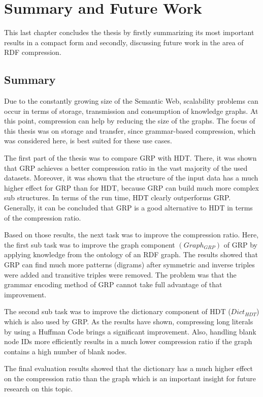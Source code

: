 \chapter{Summary and Future Work}\label{ch:summary_and_discussion}

This last chapter concludes the thesis by firstly summarizing its most important results in a compact form and secondly,  discussing  future work in the area of RDF compression.

\section{Summary}

Due to the constantly growing size of the Semantic Web, scalability problems can occur in terms of storage, transmission and consumption of knowledge graphs. At this point, compression can help by reducing the size of the graphs. The focus of this thesis was on storage and transfer, since grammar-based compression, which was considered here, is best suited for these use cases. 

The first part of the thesis was to compare GRP with HDT. There, it was shown that GRP achieves a better compression ratio in the vast majority of the used datasets. Moreover, it was shown that the structure of the input data has a much higher effect for GRP than for HDT, because GRP can build much more complex sub structures. In terms of the run time, HDT clearly outperforms GRP. Generally, it can be concluded that GRP is a good alternative to HDT in terms of the compression ratio.

Based on those results, the next task was to improve the compression ratio. Here, the first sub task was to improve the graph component $(Graph_{GRP})$ of GRP by applying knowledge from the ontology of an RDF graph. The results showed that GRP can find much more patterns (digrams) after symmetric and inverse triples were added and transitive triples were removed. The problem was that the grammar encoding method of GRP cannot take full advantage of that improvement.

The second sub task was to improve the dictionary component of HDT ($Dict_{HDT}$) which is also used by GRP. As the results have shown, compressing long literals by using a Huffman Code brings a significant improvement. Also, handling blank node IDs more efficiently results in a much lower compression ratio if the graph contains a high number of blank nodes.

The final evaluation results showed that the dictionary has a much higher effect on the compression ratio than the graph which is an important insight for future research on this topic.

